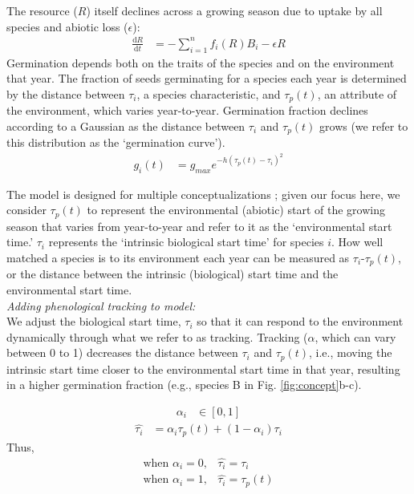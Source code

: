 \documentclass[11pt,letter]{article}
\begin{document}
The resource ($R$) itself declines across a growing season due to uptake by all species and abiotic loss ($\epsilon$):
\begin{align}
\frac{\mathrm{d}R}{\mathrm{d}t} & = - \sum_{i=1}^{n}f_{i}(R)B_{i} -\epsilon R
\end{align}
Germination depends both on the traits of the species and on the environment that year. The fraction of seeds germinating for a species each year is determined by the distance between $\tau_i$, a species characteristic, and $\tau_p(t)$, an attribute of the environment, which varies year-to-year.  Germination fraction declines according to a Gaussian as the distance between $\tau_i$ and $\tau_p(t)$ grows (we refer to this distribution as the `germination curve').  
\begin{align}
g_{i}(t) & = g_{max}e^{-h(\tau_{p}(t)-\tau_{i})^2} 
\end{align}

The model is designed for multiple conceptualizations \citep{Chesson:2004eo}; given our focus here, we consider $\tau_p(t)$ to represent the environmental (abiotic) start of the growing season that varies from year-to-year and refer to it as the `environmental start time.'  $\tau_i$ represents the `intrinsic biological start time' for species $i$. How well matched a species is to its environment each year can be measured as $\tau_i$-$\tau_p(t)$, or the distance between the intrinsic (biological) start time and the environmental start time. \\

\noindent \emph{Adding phenological tracking to model:}\\
We adjust the biological start time, $\tau_i$ so that it can respond to the environment dynamically through what we refer to as tracking. Tracking ($\alpha$, which can vary between 0 to 1) decreases the distance between $\tau_i$ and $\tau_p(t)$, i.e., moving the intrinsic start time closer to the environmental start time in that year, resulting in a higher germination fraction (e.g., species B in Fig. \ref{fig:concept}b-c).

\begin{align*}
\alpha_{i} & \in [0, 1]  
\end{align*}
\begin{align}
\hat{\tau_{i}} & = \alpha_{i} \tau_{p}(t) + (1-\alpha_{i})\tau_{i}
\end{align}
\noindent Thus, 
\begin{align*}
\text{when } \alpha_{i} = 0, & \hat{\tau_{i}}=\tau_{i}\\
\text{when }  \alpha_{i} = 1, & \hat{\tau_{i}}=\tau_{p}(t)
\end{align*}
\end{document}
